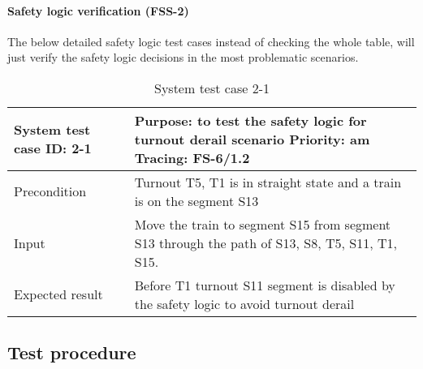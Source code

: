 \paragraph{Safety logic verification (FSS-2)} The below detailed safety logic test cases instead of checking the whole table, will just verify the safety logic decisions in the most problematic scenarios.
\begin{table}[H]
	\caption{System test case 2-1}
	\label{table:TCase-FSS2-01}
	\begin{center}
		\renewcommand{\arraystretch}{1.8}
		\begin{tabu} 
			to 0.9 \textwidth
			{  X[0.3, l] X[l] }
			\toprule
			System test case ID: 2-1 & Purpose: to test the safety logic for turnout derail scenario  \newline Priority: am \newline Tracing: FS-6/1.2 \\ \midrule
			Precondition             & Turnout T5, T1 is in straight state and a train is on the segment S13                                           \\
			Input                    & Move the train to segment S15 from segment S13 through the path of S13, S8, T5, S11, T1, S15.                   \\
			Expected result          & Before T1 turnout S11 segment is disabled by the safety logic to avoid turnout derail                           \\ \bottomrule
		\end{tabu}
	\end{center}
\end{table}

\subsection{Test procedure}
